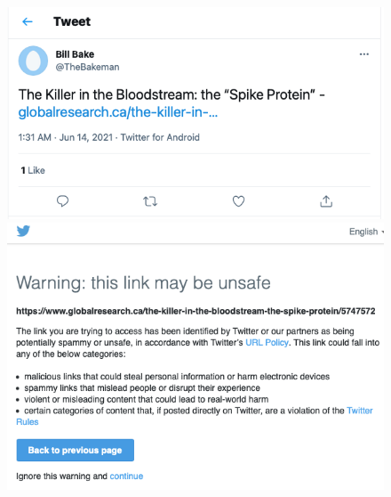 \documentclass{article}
\begin{document}
\begin{figure}
\centering	
	\begin{multicols}{1}
		\includegraphics[scale=0.35]{./img/globalresearch/tweet.png} 
	\end{multicols}
	\begin{multicols}{1}
		\includegraphics[scale=0.35]{./img/globalresearch/warning.png}
	\end{multicols}
\caption{}
\label{fig4bis}
\end{figure}



\end{document}
